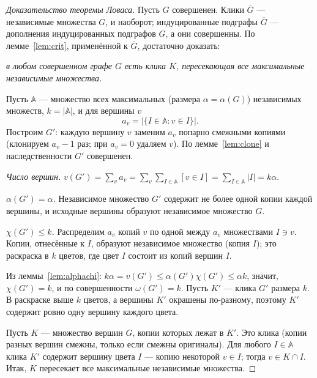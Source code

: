 \begin{proof}[Доказательство теоремы Ловаса]
Пусть \(G\) совершенен. Клики \(\overline G\) — независимые множества \(G\), и наоборот;
индуцированные подграфы \(\overline G\) — дополнения индуцированных подграфов \(G\), а они
совершенны. По лемме~\ref{lem:crit}, применённой к \(\overline G\), достаточно доказать:
\begin{center}
\emph{в любом совершенном графе \(G\) есть клика \(K\), пересекающая все максимальные
независимые множества.}
\end{center}
Пусть \(\mathbb A\) — множество всех максимальных (размера \(\alpha=\alpha(G)\)) независимых
множеств, \(k=|\mathbb A|\), и для вершины \(v\)
\[
a_v=\bigl|\{I\in\mathbb A: v\in I\}\bigr| .
\]
Построим \(G'\): каждую вершину \(v\) заменим \(a_v\) попарно смежными копиями (клонируем
\(a_v-1\) раз; при \(a_v=0\) удаляем \(v\)). По лемме~\ref{lem:clone} и наследственности \(G'\) совершенен.

\emph{Число вершин.} \(v(G')=\sum_v a_v=\sum_v\sum_{I\in\mathbb A}[v\in I]=\sum_{I\in\mathbb A}|I|=k\alpha\).

\emph{\(\alpha(G')=\alpha\).} Независимое множество \(G'\) содержит не более одной копии каждой
вершины, и исходные вершины образуют независимое множество \(G\).

\emph{\(\chi(G')\le k\).} Распределим \(a_v\) копий \(v\) по одной между \(a_v\) множествами \(I\ni v\).
Копии, отнесённые к \(I\), образуют независимое множество (копия \(I\)); это раскраска
в \(k\) цветов, где цвет \(I\) состоит из копий вершин \(I\).

Из леммы~\ref{lem:alphachi}: \(k\alpha=v(G')\le\alpha(G')\chi(G')\le\alpha k\), значит,
\(\chi(G')=k\), и по совершенности \(\omega(G')=k\). Пусть \(K'\) — клика \(G'\) размера \(k\).
В раскраске выше \(k\) цветов, а вершины \(K'\) окрашены по-разному, поэтому \(K'\) содержит
ровно одну вершину каждого цвета.

Пусть \(K\) — множество вершин \(G\), копии которых лежат в \(K'\). Это клика (копии разных
вершин смежны, только если смежны оригиналы). Для любого \(I\in\mathbb A\) клика \(K'\)
содержит вершину цвета \(I\) — копию некоторой \(v\in I\); тогда \(v\in K\cap I\).
Итак, \(K\) пересекает все максимальные независимые множества.
\end{proof}


